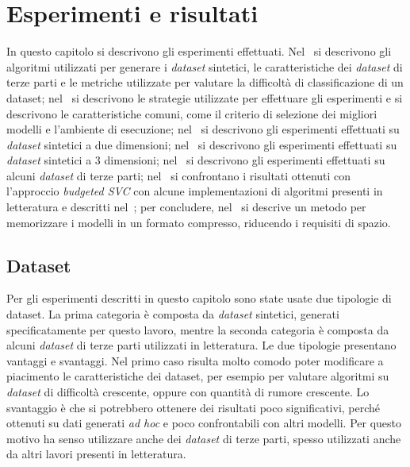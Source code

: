 \chapter{Esperimenti e risultati}
\label{chap:esperimenti}
In questo capitolo si descrivono gli esperimenti effettuati.
Nel~ si descrivono gli algoritmi utilizzati per generare i \emph{dataset} sintetici, le caratteristiche dei \emph{dataset} di terze parti e le metriche utilizzate per valutare la difficoltà di classificazione di un dataset;
nel~ si descrivono le strategie utilizzate per effettuare gli esperimenti e si descrivono le caratteristiche comuni, come il criterio di selezione dei migliori modelli e l'ambiente di esecuzione;
nel~ si descrivono gli esperimenti effettuati su \emph{dataset} sintetici a due dimensioni;
nel~ si descrivono gli esperimenti effettuati su \emph{dataset} sintetici a 3 dimensioni;
nel~ si descrivono gli esperimenti effettuati su alcuni \emph{dataset} di terze parti;
nel~ si confrontano i risultati ottenuti con l'approccio \emph{budgeted SVC} con alcune implementazioni di algoritmi presenti in letteratura e descritti nel~; per concludere, nel~ si descrive un metodo per memorizzare i modelli in un formato compresso, riducendo i requisiti di spazio. 

\section{Dataset}\label{sec:exp:dataset}
Per gli esperimenti descritti in questo capitolo sono state usate due tipologie di dataset. 
La prima categoria è composta da \emph{dataset} sintetici, generati specificatamente per questo lavoro, mentre la seconda categoria è composta da alcuni \emph{dataset} di terze parti utilizzati in letteratura. 
Le due tipologie presentano vantaggi e svantaggi. Nel primo caso risulta molto comodo poter modificare a piacimento le caratteristiche dei dataset, per esempio per valutare algoritmi su \emph{dataset} di difficoltà crescente, oppure con quantità di rumore crescente.
Lo svantaggio è che si potrebbero ottenere dei risultati poco significativi, perché ottenuti su dati generati \emph{ad hoc} e poco confrontabili con altri modelli. 
Per questo motivo ha senso utilizzare anche dei \emph{dataset} di terze parti, spesso utilizzati anche da altri lavori presenti in letteratura.

